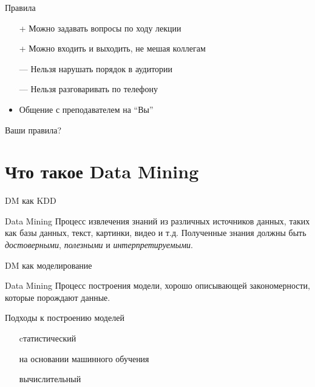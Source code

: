 \documentclass[10pt]{beamer}
\begin{document}
\begin{frame}{Правила}

\begin{itemize}
\item[+] Можно задавать вопросы по ходу лекции
\item[+] Можно входить и выходить, не мешая коллегам
\item[---] Нельзя нарушать порядок в аудитории
\item[---] Нельзя разговаривать по телефону
\item Общение с преподавателем на ``Вы''
\end{itemize}

Ваши правила?

\end{frame}

\section{Что такое Data Mining}

\begin{frame}{DM как KDD}

\begin{block}{Data Mining}
Процесс извлечения знаний из различных источников данных, таких как базы данных, текст, картинки, видео и т.д. Полученные знания должны быть {\it достоверными}, {\it полезными} и {\it интерпретируемыми}.
\end{block}

\end{frame}

\begin{frame}{DM как моделирование}

\begin{block}{Data Mining}
Процесс построения модели, хорошо описывающей закономерности, которые порождают данные.
\end{block}

\vspace{1em}
Подходы к построению моделей
\begin{itemize}
\item[\color{green}\ding{52}] cтатистический
\item[\color{green}\ding{52}] на основании машинного обучения
\item[\color{red}\ding{54}] вычислительный
\end{itemize}

\end{frame}
\end{document}
